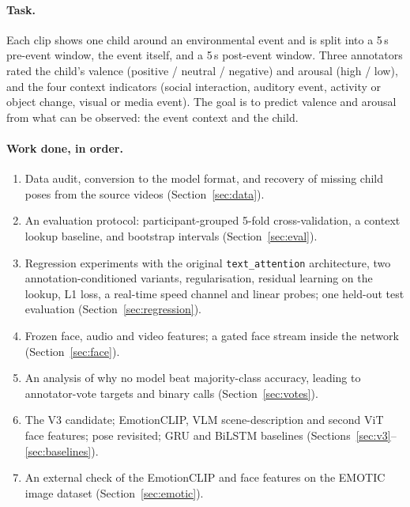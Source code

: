 \documentclass[11pt]{article}
\newcommand{\code}[1]{\texttt{#1}}
\begin{document}
\paragraph{Task.} Each clip shows one child around an environmental event and is split into a 5\,s pre-event window, the event itself, and a 5\,s post-event window. Three annotators rated the child's valence (positive / neutral / negative) and arousal (high / low), and the four context indicators (social interaction, auditory event, activity or object change, visual or media event). The goal is to predict valence and arousal from what can be observed: the event context and the child.

\paragraph{Work done, in order.}
\begin{enumerate}
  \item Data audit, conversion to the model format, and recovery of missing child poses from the source videos (Section~\ref{sec:data}).
  \item An evaluation protocol: participant-grouped 5-fold cross-validation, a context lookup baseline, and bootstrap intervals (Section~\ref{sec:eval}).
  \item Regression experiments with the original \code{text\_attention} architecture, two annotation-conditioned variants, regularisation, residual learning on the lookup, L1 loss, a real-time speed channel and linear probes; one held-out test evaluation (Section~\ref{sec:regression}).
  \item Frozen face, audio and video features; a gated face stream inside the network (Section~\ref{sec:face}).
  \item An analysis of why no model beat majority-class accuracy, leading to annotator-vote targets and binary calls (Section~\ref{sec:votes}).
  \item The V3 candidate; EmotionCLIP, VLM scene-description and second ViT face features; pose revisited; GRU and BiLSTM baselines (Sections~\ref{sec:v3}--\ref{sec:baselines}).
  \item An external check of the EmotionCLIP and face features on the EMOTIC image dataset (Section~\ref{sec:emotic}).
\end{enumerate}
\end{document}
